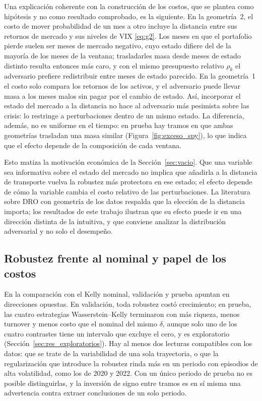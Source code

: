 Una explicación coherente con la construcción de los costos, que se plantea como hipótesis y no como resultado comprobado, es la siguiente. En la geometría~2, el costo de mover probabilidad de un mes a otro incluye la distancia entre sus retornos de mercado y sus niveles de VIX \eqref{eq:g2}. Los meses en que el portafolio pierde suelen ser meses de mercado negativo, cuyo estado difiere del de la mayoría de los meses de la ventana; trasladarles masa desde meses de estado distinto resulta entonces más caro, y con el mismo presupuesto relativo $\rho_k$ el adversario prefiere redistribuir entre meses de estado parecido. En la geometría~1 el costo solo compara los retornos de los activos, y el adversario puede llevar masa a los meses malos sin pagar por el cambio de estado. Así, incorporar el estado del mercado a la distancia no hace al adversario más pesimista sobre las crisis: lo restringe a perturbaciones dentro de un mismo estado. La diferencia, además, no es uniforme en el tiempo: en prueba hay tramos en que ambas geometrías trasladan una masa similar (Figura~\ref{fig:exceso_spy}), lo que indica que el efecto depende de la composición de cada ventana.

Esto matiza la motivación económica de la Sección~\ref{sec:vacio}. Que una variable sea informativa sobre el estado del mercado no implica que añadirla a la distancia de transporte vuelva la robustez más protectora en ese estado; el efecto depende de cómo la variable cambia el costo relativo de las perturbaciones. La literatura sobre DRO con geometría de los datos \citep{liu2022} respalda que la elección de la distancia importa; los resultados de este trabajo ilustran que su efecto puede ir en una dirección distinta de la intuitiva, y que conviene analizar la distribución adversarial y no solo el desempeño.

\subsection{Robustez frente al nominal y papel de los costos}\label{sec:disc_costos}

En la comparación con el Kelly nominal, validación y prueba apuntan en direcciones opuestas. En validación, toda robustez costó crecimiento; en prueba, las cuatro estrategias Wasserstein--Kelly terminaron con más riqueza, menos turnover y menos costo que el nominal del mismo $\delta$, aunque solo uno de los cuatro contrastes tiene un intervalo que excluye el cero, y es exploratorio (Sección~\ref{sec:res_exploratorios}). Hay al menos dos lecturas compatibles con los datos: que se trate de la variabilidad de una sola trayectoria, o que la regularización que introduce la robustez rinda más en un periodo con episodios de alta volatilidad, como los de 2020 y 2022. Con un único periodo de prueba no es posible distinguirlas, y la inversión de signo entre tramos es en sí misma una advertencia contra extraer conclusiones de un solo periodo.

